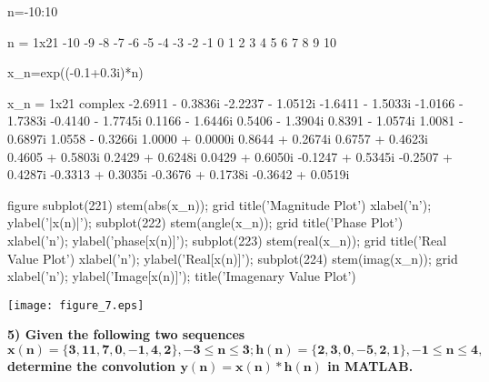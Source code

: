 \documentclass[12pt, onecolumn]{IEEEtran}
\begin{document}
	
	\begin{matlabcode}
		n=-10:10
	\end{matlabcode}
	\begin{matlaboutput}
		n = 1x21    
		-10    -9    -8    -7    -6    -5    -4    -3    -2    -1     0     1     2     3     4     5     6     7     8     9    10
		
	\end{matlaboutput}
	\begin{matlabcode}
		x_n=exp((-0.1+0.3i)*n)
	\end{matlabcode}
	\begin{matlaboutput}
		x_n = 1x21 complex    
		-2.6911 - 0.3836i  -2.2237 - 1.0512i  -1.6411 - 1.5033i  -1.0166 - 1.7383i  -0.4140 - 1.7745i   0.1166 - 1.6446i   0.5406 - 1.3904i   0.8391 - 1.0574i   1.0081 - 0.6897i   1.0558 - 0.3266i   1.0000 + 0.0000i   0.8644 + 0.2674i   0.6757 + 0.4623i   0.4605 + 0.5803i   0.2429 + 0.6248i   0.0429 + 0.6050i  -0.1247 + 0.5345i  -0.2507 + 0.4287i  -0.3313 + 0.3035i  -0.3676 + 0.1738i  -0.3642 + 0.0519i
		
	\end{matlaboutput}
	\begin{matlabcode}
		figure
		subplot(221)
		stem(abs(x_n)); grid
		title('Magnitude Plot')
		xlabel('n'); 
		ylabel('|x(n)|');
		subplot(222)
		stem(angle(x_n)); grid
		title('Phase Plot')
		xlabel('n'); 
		ylabel('phase[x(n)]');
		subplot(223)
		stem(real(x_n)); grid
		title('Real Value Plot')
		xlabel('n'); 
		ylabel('Real[x(n)]');
		subplot(224)
		stem(imag(x_n)); grid
		xlabel('n'); 
		ylabel('Image[x(n)]');
		title('Imagenary Value Plot')
	\end{matlabcode}
	\begin{center}
		\texttt{[image: figure\_7.eps]}
	\end{center}
	
	\begin{par}
		\begin{flushleft}
			\textbf{5) Given the following two sequences $\mathbf{x(n) = \{3, 11, 7, 0, -1, 4, 2\} , -3 \leq n \leq3; h(n) = \{2, 3, 0, -5, 2, 1\} , -1 \leq n \leq 4,}$ determine the convolution $\mathbf{y(n) = x(n)*h(n)}$ in MATLAB.}
		\end{flushleft}
	\end{par}
	
\end{document}
